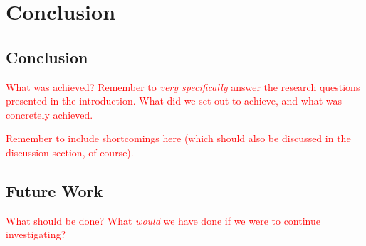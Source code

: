 \chapter{Conclusion}

\section{Conclusion}

\textcolor{red}{
  What was achieved? Remember to \textit{very specifically} answer the research
questions presented in the introduction. What did we set out to achieve, and
what was concretely achieved.
}

\textcolor{red}{
  Remember to include shortcomings here (which should also be discussed in the
discussion section, of course).
}

\section{Future Work}

\textcolor{red}{
  What should be done? What \textit{would} we have done if we were to continue
investigating?
}

